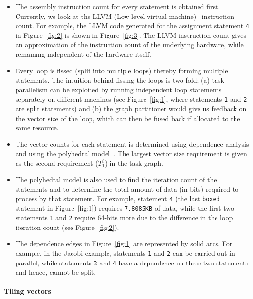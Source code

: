 \begin{itemize}

\item The assembly instruction count for every statement is obtained
  first. Currently, we look at the LLVM (Low level virtual
  machine)~\cite{clat04} instruction count. For example, the LLVM code
  generated for the assignment statement \texttt{4} in
  Figure~\ref{fig:2} is shown in Figure~\ref{fig:3}. The LLVM
  instruction count gives an approximation of the instruction count of
  the underlying hardware, while remaining independent of the hardware
  itself.

\item Every loop is fissed (split into multiple loops) thereby forming
  multiple statements. The intuition behind fissing the loops is two
  fold: (a) task parallelism can be exploited by running independent
  loop statements separately on different machines (see
  Figure~\ref{fig:1}, where statements \texttt{1} and \texttt{2} are
  split statements) and (b) the graph partitioner would give us feedback
  on the vector size of the loop, which can then be fused back if
  allocated to the same resource.

\item The vector counts for each statement is determined using
  dependence analysis and using the polyhedral model~\cite{mgri98}. The
  largest vector size requirement is given as the second requirement
  ($T^i_1$) in the task graph.

\item The polyhedral model is also used to find the iteration count of
  the statements and to determine the total amount of data (in bits)
  required to process by that statement. For example, statement
  \texttt{4} (the last \texttt{boxed} statement in Figure~\ref{fig:1})
  requires \texttt{7.8085KB} of data, while the first two statements
  \texttt{1} and \texttt{2} require 64-bits more due to the difference
  in the loop iteration count (see Figure~\ref{fig:2}).

\item The dependence edges in Figure~\ref{fig:1} are represented by solid
arcs. For example, in the Jacobi example, statements \texttt{1} and
  \texttt{2} can be carried out in parallel, while statements
  \texttt{3} and \texttt{4} have a dependence on these two statements
  and hence, cannot be split.

\end{itemize}

\paragraph{\textbf{Tiling vectors}}
\label{sec:tiling-vector-counts}

